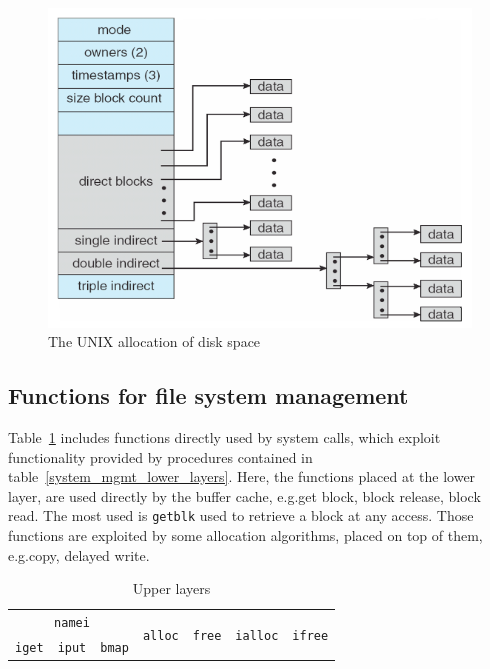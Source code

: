 \documentclass{report}
\begin{document}
\begin{figure}[hbtp]
\centering
\includegraphics[scale=0.35]{images/file_system/unix_combined_scheme.png}
\caption{The UNIX allocation of disk space}
\end{figure}

\subsection{Functions for file system management}
Table~\ref{system_mgmt_upper_layers} includes functions directly used by system calls, which exploit functionality provided by procedures contained in table~\ref{system_mgmt_lower_layers}. Here, the functions placed at the lower layer, are used directly by the buffer cache, e.g.\@ get block, block release, block read. The most used is \texttt{getblk} used to retrieve a block at any access. Those functions are exploited by some allocation algorithms, placed on top of them, e.g.\@ copy, delayed write.

\begin{table}
\centering
\begin{tabular}{|c|c|c|cc|cc|}
\hline 
\multicolumn{3}{|c|}{\texttt{namei}} & \multirow{2}{*}{\texttt{alloc}} & \multirow{2}{*}{\texttt{free}} & \multirow{2}{*}{\texttt{ialloc}} & \multirow{2}{*}{\texttt{ifree}} \\\cline{1-3} 
\texttt{iget} & \texttt{iput} & \texttt{bmap} & & & & \\ 
\hline 
\end{tabular}
\caption{Upper layers}
\label{system_mgmt_upper_layers}
\end{table} 
\end{document}
